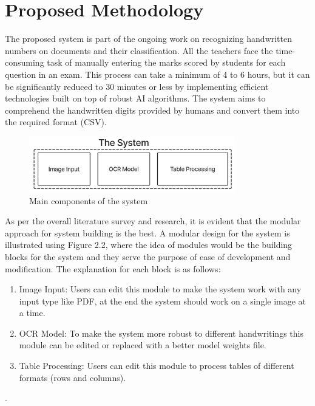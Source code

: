 \chapter{Proposed Methodology}

The proposed system is part of the ongoing work on recognizing handwritten numbers on documents and their classification. All the teachers face the time-consuming task of manually entering the marks scored by students for each question in an exam. This process can take a minimum of 4 to 6 hours, but it can be significantly reduced to 30 minutes or less by implementing efficient technologies built on top of robust AI algorithms. The system aims to comprehend the handwritten digits provided by humans and convert them into the required format (CSV).

\vspace{1.5mm}

\begin{figure}[h!]
    \centering
    \includegraphics[width=0.8\textwidth]{Images/lit_review/main_components_of_MP.jpg}
    \caption{Main components of the system}
\end{figure}

\noindent
As per the overall literature survey and research, it is evident that the modular approach for system building is the best. A modular design for the system is illustrated using Figure 2.2, where the idea of modules would be the building blocks for the system and they serve the purpose of ease of development and modification. The explanation for each block is as follows: 

\clearpage

\begin{enumerate}
    \item Image Input: Users can edit this module to make the system work with any input type like PDF, at the end the system should work on a single image at a time.
    \item OCR Model: To make the system more robust to different handwritings this module can be edited or replaced with a better model weights file. 
    \item Table Processing: Users can edit this module to process tables of different formats (rows and columns).
\end{enumerate}.

